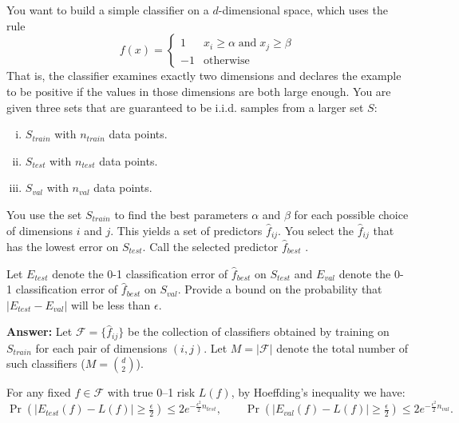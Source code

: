 \documentclass[a4paper]{article}
\begin{document}
\section{}
You want to build a simple classifier on a $d$-dimensional space, which uses the rule
$$f(x) = \left\{ \begin{array}{ll}
        1 & x_i \geq \alpha \; \text{and} \; x_j \geq \beta \\
        -1 & \text{otherwise}
\end{array}\right.$$
That is, the classifier examines exactly two dimensions and declares the example to be positive if the values in those dimensions are both large enough.
You are given three sets that are guaranteed to be i.i.d. samples from a larger set $S$:
\begin{enumerate}[(i)]
    \item $S_\mathit{train}$ with $n_\mathit{train}$ data points.
    \item $S_\mathit{test}$ with $n_\mathit{test}$ data points.
    \item $S_\mathit{val}$ with $n_\mathit{val}$ data points.
\end{enumerate}
You use the set $S_\mathit{train}$ to find the best parameters $\alpha$ and $\beta$ for each possible choice of dimensions $i$ and $j$.
This yields a set of predictors $\hat{f}_{ij}$.
You select the $\hat{f}_{ij}$ that has the lowest error on $S_\mathit{test}$.
Call the selected predictor $\hat{f}_{best}$ .

Let $E_\mathit{test}$ denote the 0-1 classification error of $\hat{f}_{best}$ on $S_\mathit{test}$ and $E_\mathit{val}$ denote the 0-1 classification error of $\hat{f}_{best}$ on $S_\mathit{val}$.
Provide a bound on the probability that $|E_\mathit{test} - E_\mathit{val}|$ will be less than $\epsilon$.


\textbf{Answer:}
Let $\mathcal{F} = \{\hat{f}_{ij}\}$ be the collection of classifiers obtained by training on \( S_{\mathit{train}} \) for each pair of dimensions \((i,j)\).  
Let \( M = |\mathcal{F}| \) denote the total number of such classifiers (\( M = \binom{d}{2} \)).

For any fixed \( f \in \mathcal{F} \) with true 0–1 risk \( L(f) \), by Hoeffding’s inequality we have:
\[
\Pr\!\left( |E_{\mathit{test}}(f) - L(f)| \ge \tfrac{\epsilon}{2} \right)
    \le 2 e^{ -\frac{\epsilon^2}{2} n_{\mathit{test}} },
    \qquad
\Pr\!\left( |E_{\mathit{val}}(f) - L(f)| \ge \tfrac{\epsilon}{2} \right)
    \le 2 e^{ -\frac{\epsilon^2}{2} n_{\mathit{val}} }.
\]
\end{document}
